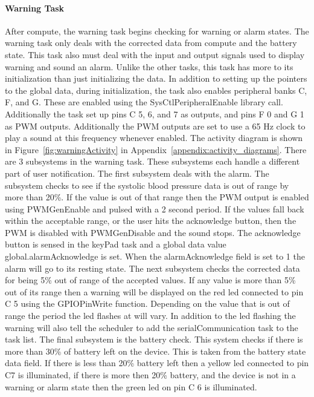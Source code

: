 \documentclass[12pt]{article} %
\begin{document}
    \paragraph{Warning Task} After compute, the warning task begins checking
    for warning or alarm states. The warning task only deals with the corrected
    data from compute and the battery state. This task also must deal with the
    input and output signals used to display warning and sound an alarm. Unlike
    the other tasks, this task has more to its initialization than just
    initializing the data. In addition to setting up the pointers to the global
    data, during initialization, the task also enables peripheral banks C, F,
    and G. These are enabled using the SysCtlPeripheralEnable library call.
    Additionally the task set up pins C 5, 6, and 7 as outputs, and pins F 0
    and G 1 as PWM outputs. Additionally the PWM outputs are set to use a 65 Hz
    clock to play a sound at this frequency whenever enabled. The activity
    diagram is shown in Figure~\ref{fig:warningActivity} in Appendix~\ref{appendix:activity_diagrams}. There
    are 3 subsystems in the warning task. These subsystems each handle a
    different part of user notification. The first subsystem deals with the
    alarm. The subsystem checks to see if the systolic blood pressure data is
    out of range by more than 20\%. If the value is out of that range then the
    PWM output is enabled using PWMGenEnable and pulsed with a 2 second period.
    If the values fall back within the acceptable range, or the user hits the
    acknowledge button, then the PWM is disabled with PWMGenDisable and the
    sound stops. The acknowledge button is sensed in the keyPad task and a
    global data value global.alarmAcknowledge is set. When the alarmAcknowledge
    field is set to 1 the alarm will go to its resting state. The next
    subsystem checks the corrected data for being 5\% out of range of the
    accepted values. If any value is more than 5\% out of its range then a
    warning will be displayed on the red led connected to pin C 5 using the
    GPIOPinWrite function. Depending on the value that is out of range the
    period the led flashes at will vary. In addition to the led flashing the
    warning will also tell the scheduler to add the serialCommunication task to
    the task list. The final subsystem is the battery check. This system checks
    if there is more than 30\% of battery left on the device. This is taken
    from the battery state data field. If there is less than 20\% battery left
    then a yellow led connected to pin C7 is illuminated, if there is more then
    20\% battery, and the device is not in a warning or alarm state then the
    green led on pin C 6 is illuminated. 
    
\end{document}
